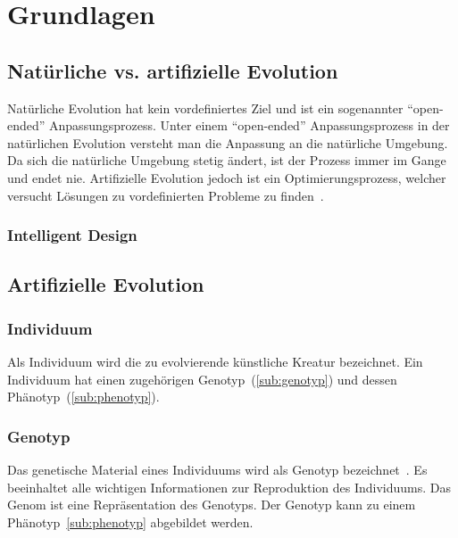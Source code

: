 %
%


\chapter{Grundlagen}

  \section{Natürliche vs\@. artifizielle Evolution}

    Natürliche Evolution hat kein vordefiniertes Ziel und ist ein sogenannter ``open-ended'' Anpassungsprozess.
    Unter einem ``open-ended'' Anpassungsprozess in der natürlichen Evolution versteht man die Anpassung an die natürliche Umgebung.
    Da sich die natürliche Umgebung stetig ändert, ist der Prozess immer im Gange und endet nie.
    Artifizielle Evolution jedoch ist ein Optimierungsprozess,
    welcher versucht Lösungen zu vordefinierten Probleme zu finden~\cite[S.1]{book:bioInspired}.

    \subsection{Intelligent Design\label{sub:IntelligentDesign}}


  \section{Artifizielle Evolution}

    \subsection{Individuum\label{sub:individual}}

      Als Individuum wird die zu evolvierende künstliche Kreatur bezeichnet.
      Ein Individuum hat einen zugehörigen Genotyp~(\vref{sub:genotyp}) und dessen Phänotyp~(\vref{sub:phenotyp}).

    \subsection{Genotyp\label{sub:genotyp}}

      Das genetische Material eines Individuums wird als Genotyp bezeichnet~\cite[S.5]{book:bioInspired}.
      Es beeinhaltet alle wichtigen Informationen zur Reproduktion des Individuums.
      Das Genom ist eine Repräsentation des Genotyps.
      Der Genotyp kann zu einem Phänotyp~\vref{sub:phenotyp} abgebildet werden.

